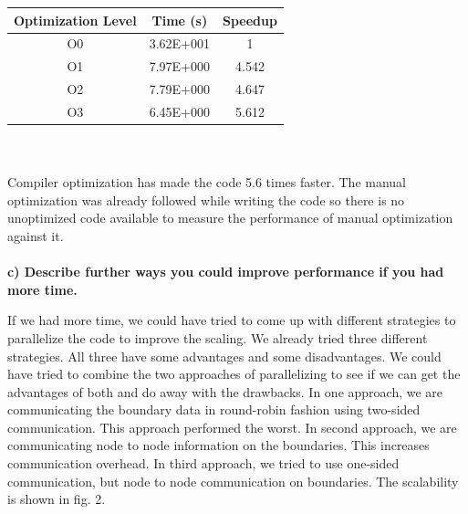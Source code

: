 \documentclass[a4paper, 11pt, oneside]{scrartcl}
\begin{document}
\begin{tabular}{|c|c|c|}
\hline 
Optimization Level & Time (s) & Speedup \\ 
\hline 
O0 & 3.62E+001 & 1 \\ 
\hline 
O1 & 7.97E+000 & 4.542 \\ 
\hline 
O2 & 7.79E+000 & 4.647 \\ 
\hline 
O3 & 6.45E+000 & 5.612 \\ 
\hline 
\end{tabular} 
\\
\\
Compiler optimization has made the code 5.6 times faster. The manual optimization was already followed while writing the code so there is no unoptimized code available to measure the performance of manual optimization against it.
\\
\\
\textbf{c) Describe further ways you could improve performance if you had more time.}

If we had more time, we could have tried to come up with different strategies to parallelize the code to improve the scaling. We already tried three different strategies. All three have some advantages and some disadvantages. We could have tried to combine the two approaches of parallelizing to see if we can get the advantages of both and do away with the drawbacks. In one approach, we are communicating the boundary data in round-robin fashion using two-sided communication. This approach performed the worst. In second approach, we are communicating node to node information on the boundaries. This increases communication overhead. In third approach, we tried to use one-sided communication, but node to node communication on boundaries. The scalability is shown in fig. 2.
\end{document}
